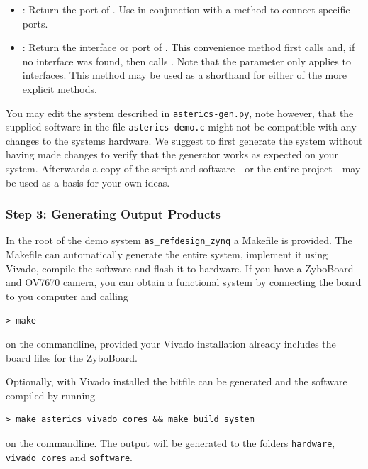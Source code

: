 \begin{itemize}
\item {}: Return the port  of . Use in conjunction with a  method to connect specific ports.
\item {}: Return the interface or port  of . This convenience method first calls  and, if no interface  was found, then calls . Note that the parameter  only applies to interfaces. This method may be used as a shorthand for either of the more explicit methods.
\end{itemize}

You may edit the system described in \texttt{asterics-gen.py}, note however, that the supplied software in the file \texttt{asterics-demo.c} might not be compatible with any changes to the systems hardware.
We suggest to first generate the system without having made changes to verify that the generator works as expected on your system.
Afterwards a copy of the script and software - or the entire project - may be used as a basis for your own ideas.


\subsubsection{Step 3: Generating Output Products}

In the root of the demo system \texttt{as\_refdesign\_zynq} a Makefile is provided.
The Makefile can automatically generate the entire system, implement it using Vivado, compile the software and flash it to hardware.
If you have a ZyboBoard and OV7670 camera, you can obtain a functional system by connecting the board to you computer and calling 
\begin{lstlisting}[style=shell]
 > make
\end{lstlisting}
on the commandline, provided your Vivado installation already includes the board files for the ZyboBoard.

Optionally, with Vivado installed the bitfile can be generated and the software compiled by running 
\begin{lstlisting}[style=shell]
 > make asterics_vivado_cores && make build_system
\end{lstlisting}
on the commandline.
The output will be generated to the folders \texttt{hardware}, \texttt{vivado\_cores} and \texttt{software}.

